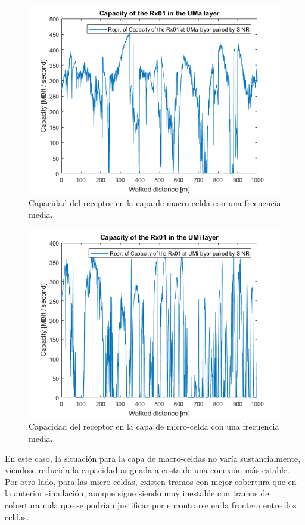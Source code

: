 \begin{figure}[h!]
	\centering
    \includegraphics[width=0.8\linewidth]{imagenes/6_3_capacidad_uma_medio.png}
	\caption{Capacidad del receptor en la capa de macro-celda con una frecuencia media.}
	\label{fig:simulacion_freq_med_uma}
\end{figure}

\begin{figure}[h!]
	\centering
    \includegraphics[width=0.8\linewidth]{imagenes/6_3_capacidad_umi_medio.png}
	\caption{Capacidad del receptor en la capa de micro-celda con una frecuencia media.}
	\label{fig:simulacion_freq_med_umi}
\end{figure}

En este caso, la situación para la capa de macro-celdas no varía sustancialmente, viéndose reducida la capacidad asignada a costa de una conexión más estable. Por otro lado, para las micro-celdas, existen tramos con mejor cobertura que en la anterior simulación, aunque sigue siendo muy inestable con tramos de cobertura nula que se podrían justificar por encontrarse en la frontera entre dos celdas.

